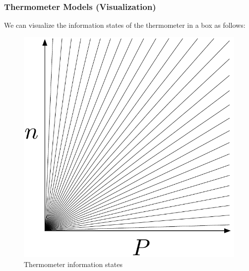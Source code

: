 \begin{frame}
\frametitle{Thermometer Models (Visualization)}
\begin{itemizedot}
  \item We can visualize the information states of the thermometer in a box as
  follows:
  
  \begin{figure}[h]
    \includegraphics[scale=.5]{../Humans/therm.pdf} 
    \caption{Thermometer information states}
  \end{figure}
\end{itemizedot}
\end{frame}
